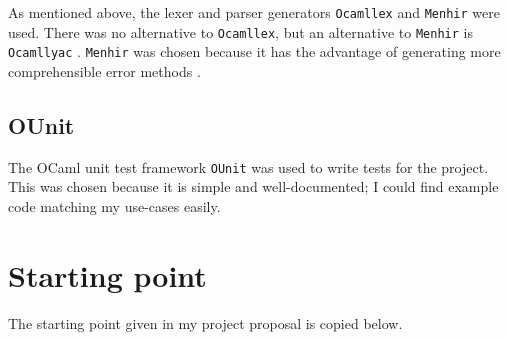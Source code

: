 \documentclass[12pt,a4paper]{report}
\begin{document}
As mentioned above, the lexer and parser generators \texttt{Ocamllex} and \texttt{Menhir} were used. There was no alternative to \texttt{Ocamllex}, but an alternative to \texttt{Menhir} is \texttt{Ocamllyac} \cite{ocamlyacc}. \texttt{Menhir} was chosen because it has the advantage of generating more comprehensible error methods \cite{ocamlBook}.






\subsection{OUnit}

The OCaml unit test framework \texttt{OUnit} \cite{OUnit} was used to write tests for the project. This was chosen because it is simple and well-documented; I could find example code matching my use-cases easily.

\section{Starting point}

The starting point given in my project proposal is copied below.
\end{document}
